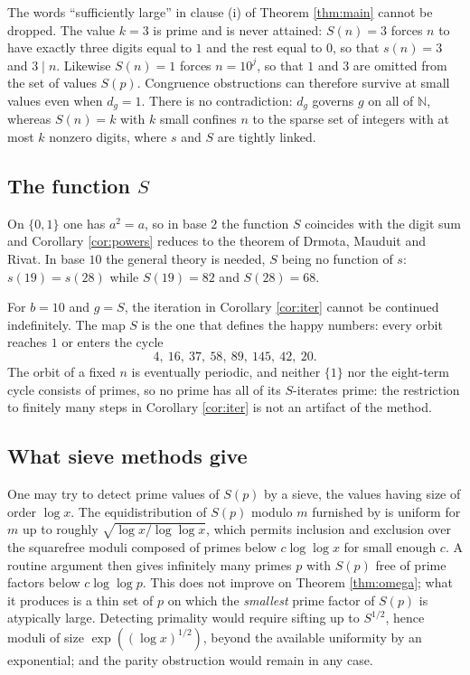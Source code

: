 \documentclass[11pt,reqno]{amsart}
\theoremstyle{plain}
\theoremstyle{definition}
\newcommand{\N}{\mathbb{N}}
\begin{document}
The words ``sufficiently large'' in clause (i) of Theorem \ref{thm:main} cannot be dropped. The value $k=3$ is prime and is never attained: $S(n)=3$ forces $n$ to have exactly three digits equal to $1$ and the rest equal to $0$, so that $s(n)=3$ and $3\mid n$. Likewise $S(n)=1$ forces $n=10^{j}$, so that $1$ and $3$ are omitted from the set of values $S(p)$. Congruence obstructions can therefore survive at small values even when $d_g=1$. There is no contradiction: $d_g$ governs $g$ on all of $\N$, whereas $S(n)=k$ with $k$ small confines $n$ to the sparse set of integers with at most $k$ nonzero digits, where $s$ and $S$ are tightly linked.

\subsection{The function \texorpdfstring{$S$}{S}}\label{sec:S}
On $\{0,1\}$ one has $a^2=a$, so in base $2$ the function $S$ coincides with the digit sum and Corollary \ref{cor:powers} reduces to the theorem of Drmota, Mauduit and Rivat. In base $10$ the general theory is needed, $S$ being no function of $s$: $s(19)=s(28)$ while $S(19)=82$ and $S(28)=68$.

For $b=10$ and $g=S$, the iteration in Corollary \ref{cor:iter} cannot be continued indefinitely. The map $S$ is the one that defines the happy numbers: every orbit reaches $1$ or enters the cycle
\[
4,\ 16,\ 37,\ 58,\ 89,\ 145,\ 42,\ 20 .
\]
The orbit of a fixed $n$ is eventually periodic, and neither $\{1\}$ nor the eight-term cycle consists of primes, so no prime has all of its $S$-iterates prime: the restriction to finitely many steps in Corollary \ref{cor:iter} is not an artifact of the method.

\subsection{What sieve methods give}\label{sec:sieve}
One may try to detect prime values of $S(p)$ by a sieve, the values having size of order $\log x$. The equidistribution of $S(p)$ modulo $m$ furnished by \cite{mmr2015} is uniform for $m$ up to roughly $\sqrt{\log x/\log\log x}$, which permits inclusion and exclusion over the squarefree moduli composed of primes below $c\log\log x$ for small enough $c$. A routine argument then gives infinitely many primes $p$ with $S(p)$ free of prime factors below $c\log\log p$. This does not improve on Theorem \ref{thm:omega}; what it produces is a thin set of $p$ on which the \emph{smallest} prime factor of $S(p)$ is atypically large. Detecting primality would require sifting up to $S^{1/2}$, hence moduli of size $\exp((\log x)^{1/2})$, beyond the available uniformity by an exponential; and the parity obstruction would remain in any case.
\end{document}
